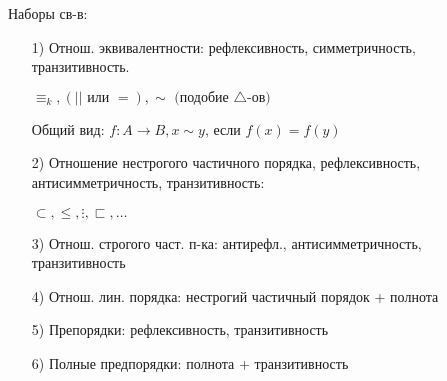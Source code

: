 Наборы св-в:
\begin{itemize}
  \item [1) ] Отнош. эквивалентности: рефлексивность, симметричность, транзитивность.
    \begin{example}
    $\equiv_k, (|| \text{ или } =), \sim \text{ (подобие $\triangle$-ов)}$
    \end{example}

    Общий вид: $f\colon A \rightarrow B, x \sim y$, если $f(x) = f(y)$
  \item [2) ] Отношение нестрогого частичного порядка, рефлексивность, антисимметричность, транзитивность:
    \begin{example}
    $\subset, \leq, \vdots, \sqsubset, \ldots$
    \end{example}
  \item [3) ] Отнош. строгого част. п-ка: антирефл., антисимметричность, транзитивность
  \item [4) ] Отнош. лин. порядка: нестрогий частичный порядок + полнота
  \item [5) ] Препорядки: рефлексивность, транзитивность
  \item [6) ] Полные предпорядки: полнота + транзитивность
\end{itemize}

